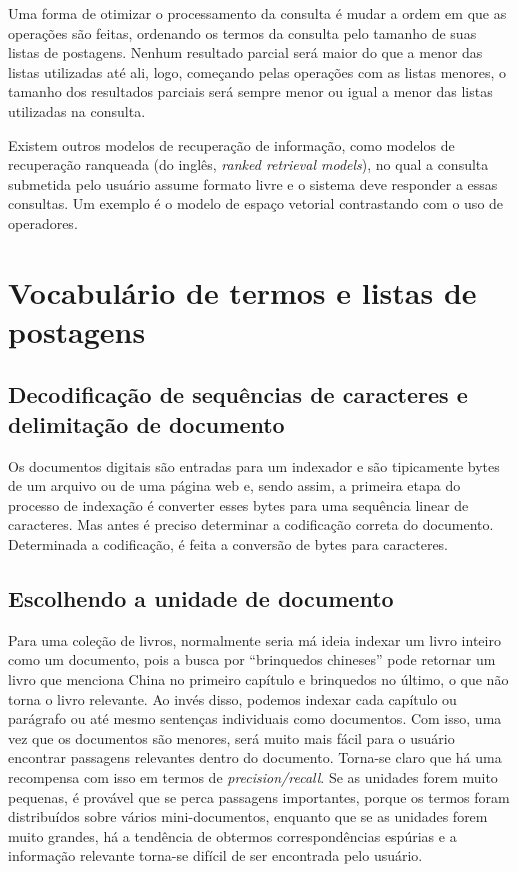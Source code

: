 Uma forma de otimizar o processamento da consulta é mudar a ordem em que as operações são feitas, ordenando os termos da consulta pelo tamanho de suas listas de postagens. Nenhum resultado parcial será maior do que a menor das listas utilizadas até ali, logo, começando pelas operações com as listas menores, o tamanho dos resultados parciais será sempre menor ou igual a menor das listas utilizadas na consulta.

Existem outros modelos de recuperação de informação, como modelos de recuperação ranqueada (do inglês, \emph{ranked retrieval models}), no qual a consulta submetida pelo usuário assume formato livre e o sistema deve responder a essas consultas. Um exemplo é o modelo de espaço vetorial contrastando com o uso de operadores.

\section{Vocabulário de termos e listas de postagens}
\label{sec:lista_postagens}

\subsection{Decodificação de sequências de caracteres e delimitação de documento}
%

Os documentos digitais são entradas para um indexador e são tipicamente bytes de um arquivo ou de uma página web e, sendo assim, a primeira etapa do processo de indexação é converter esses bytes para uma sequência linear de caracteres. Mas antes é preciso determinar a codificação correta do documento. Determinada a codificação, é feita a conversão de bytes para caracteres. 

\subsection{Escolhendo a unidade de documento}

Para uma coleção de livros, normalmente seria má ideia indexar um livro inteiro como um documento, pois a busca por ``brinquedos chineses'' pode retornar um livro que menciona China no primeiro capítulo e brinquedos no último, o que não torna o livro relevante. Ao invés disso, podemos indexar cada capítulo ou parágrafo ou até mesmo sentenças individuais como documentos. Com isso, uma vez que os documentos são menores, será muito mais fácil para o usuário encontrar passagens relevantes dentro do documento. Torna-se claro que há uma recompensa com isso em termos de \emph{precision/recall}. Se as unidades forem muito pequenas, é provável que se perca passagens importantes, porque os termos foram distribuídos sobre vários mini-documentos, enquanto que se as unidades forem muito grandes, há a tendência de obtermos correspondências espúrias e a informação relevante torna-se difícil de ser encontrada pelo usuário.

